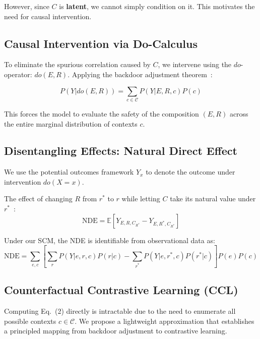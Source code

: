 \documentclass{acmart}
\begin{document}
However, since $C$ is \textbf{latent}, we cannot simply condition on it. This motivates the need for causal intervention.

\subsection{Causal Intervention via Do-Calculus}
To eliminate the spurious correlation caused by $C$, we intervene using the $do$-operator: $do(E, R)$. Applying the backdoor adjustment theorem~\cite{pearl2009causality}:

\begin{equation}
P(Y | do(E, R)) = \sum_{c \in \mathcal{C}} P(Y | E, R, c) P(c)
\end{equation}

This forces the model to evaluate the safety of the composition $(E, R)$ across the entire marginal distribution of contexts $c$.

\subsection{Disentangling Effects: Natural Direct Effect}
We use the potential outcomes framework $Y_x$ to denote the outcome under intervention $do(X=x)$.

\begin{definition}
The effect of changing $R$ from $r^*$ to $r$ while letting $C$ take its natural value under $r^*$~\cite{pearl2001direct}:
\begin{equation}
\text{NDE} = \mathbb{E} \left[ Y_{E, R, C_{R^*}} - Y_{E, R^*, C_{R^*}} \right]
\end{equation}
\end{definition}

\begin{theorem}
Under our SCM, the NDE is identifiable from observational data as:
\begin{equation}
\label{eq:nde}
\text{NDE} = \sum_{e, c} \left[ \sum_{r} P(Y | e, r, c) P(r | c) - \sum_{r^*} P(Y | e, r^*, c) P(r^* | c) \right] P(e) P(c)
\end{equation}
\end{theorem}

\subsection{Counterfactual Contrastive Learning (CCL)}
\label{subsec:ccl_theory}

Computing Eq.~(2) directly is intractable due to the need to enumerate all possible contexts $c \in \mathcal{C}$. We propose a lightweight approximation that establishes a principled mapping from backdoor adjustment to contrastive learning.
\end{document}
